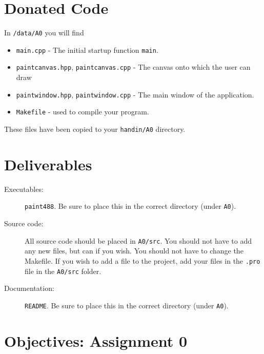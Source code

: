 \section{Donated Code}
In \texttt{\CourseData/data/A0} you will find
\begin{itemize}
        \item \texttt{main.cpp} - The initial startup function
          \texttt{main}.
        \item \texttt{paintcanvas.hpp}, \texttt{paintcanvas.cpp} - The
          canvas onto which the user can draw
        \item \texttt{paintwindow.hpp}, \texttt{paintwindow.cpp} - The
          main window of the application.
        \item \texttt{Makefile} - used to compile your program.
\end{itemize}
These files have been copied to your \texttt{handin/A0} directory.

\section{Deliverables}
\begin{description}
\item[Executables:] \hfill

        \texttt{paint488}.  Be sure to place this in the correct
        directory (under \texttt{A0}).

\item[Source code:] \hfill
        
        All source code should be placed in \texttt{A0/src}. You
        should not have to add any new files, but can if you wish. You
        should not have to change the Makefile. If you wish to add a file 
        to the project, add your files in the \texttt{.pro} file in 
        the \texttt{A0/src} folder.
       
\item[Documentation:] \hfill

        \texttt{README}.  Be sure to place this in the correct directory 
        (under \texttt{A0}).
\end{description}

\newpage
\section{Objectives: \hfill Assignment 0}

 \bigskip

